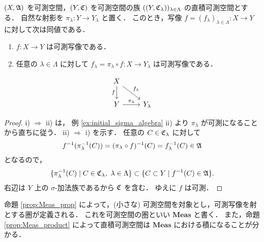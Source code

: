 \begin{proposition}\label{prop:Meas_product}
    $(X,\mathfrak{A})$ を可測空間，$(Y,\mathfrak{C})$ を可測空間の族 $((Y,\mathfrak{C}_\lambda))_{\lambda\in\Lambda}$ の直積可測空間とする．
    自然な射影を $\pi_\lambda:Y\to Y_\lambda$ と置く．
    このとき，写像 $f=(f_\lambda)_{\lambda\in\Lambda}:X\to Y$ に対して次は同値である．
    \begin{enumerate}
        \item $f:X\to Y$ は可測写像である．
        \item 任意の $\lambda\in\Lambda$ に対して $f_\lambda=\pi_\lambda\circ f:X\to Y_\lambda$ は可測写像である．
    \end{enumerate}
    \begin{equation*}
        \begin{tikzcd}
            X\arrow[rd,"f_\lambda"]\arrow[d,"f"']\\
            Y\arrow[r,"\pi_\lambda"]&Y_\lambda
        \end{tikzcd}
    \end{equation*}
\end{proposition}

\begin{proof}
    \textrm{i)} $\Rightarrow$ \textrm{ii)} は，
    例 \ref{ex:initial_sigma_algebra} \textrm{ii)} より $\pi_\lambda$ が可測になることから直ちに従う．
    \textrm{ii)} $\Rightarrow$ \textrm{i)} を示す．
    任意の $C\in\mathfrak{C}_\lambda$ に対して
    \begin{align*}
        f^{-1}(\pi_\lambda^{-1}(C))
        =(\pi_\lambda\circ f)^{-1}(C)
        =f_\lambda^{-1}(C)\in\mathfrak{A}
    \end{align*}
    となるので，
    \begin{align*}
        \{\pi_\lambda^{-1}(C)\mid C\in\Cfrak_\lambda,\ \lambda\in\Lambda\}
        \subset\{C\subset Y\mid f^{-1}(C)\in\Afrak\}.
    \end{align*}
    右辺は $Y$ 上の $\sigma$-加法族であるから $\mathfrak{C}$ を含む．
    ゆえに $f$ は可測．
\end{proof}

\begin{remark}
    命題 \ref{prop:Meas_prop} によって，(小さな) 可測空間を対象とし，可測写像を射とする圏が定義される．
    これを可測空間の圏といい $\mathbf{Meas}$ と書く．
    また，命題 \ref{prop:Meas_product} によって直積可測空間は $\mathbf{Meas}$ における積になることが分かる．
\end{remark}


